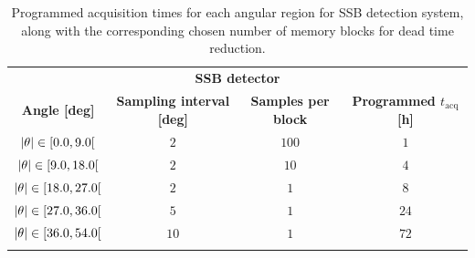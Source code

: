 \documentclass[../../main/main.tex]{subfiles}
\begin{document}
\begin{table}[h]
    \begin{tabular}{cccc}
        \toprule
        \multicolumn{4}{c}{\small \bf SSB detector}  \\
        \colrule
        \textbf{Angle [deg]}    &
        \textbf{Sampling interval [deg]}   &
        \textbf{Samples per block}  &
        \textbf{\boldmath Programmed \( t_{\mathrm{acq}} \) [h]}    \\
        \colrule
        \( \abs{\theta} \in [ 0.0,  9.0[ \)   &   \(  2 \)  &   \( 100 \)    &    \(   1 \)   \\
        \( \abs{\theta} \in [ 9.0, 18.0[ \)   &   \(  2 \)  &   \(  10 \)    &    \(   4 \)   \\
        \( \abs{\theta} \in [18.0, 27.0[ \)   &   \(  2 \)  &   \(   1 \)    &    \(   8 \)   \\
        \( \abs{\theta} \in [27.0, 36.0[ \)   &   \(  5 \)  &   \(   1 \)    &    \(  24 \)   \\
        \( \abs{\theta} \in [36.0, 54.0[ \)   &   \( 10 \)  &   \(   1 \)    &    \(  72 \)   \\
        \botrule
    \end{tabular}
    \caption{Programmed acquisition times for each angular region for SSB detection system, along with the corresponding chosen number of memory blocks for dead time reduction.}
    \label{tab:tempiPICO}
\end{table}

                            
       
        
\end{document}
